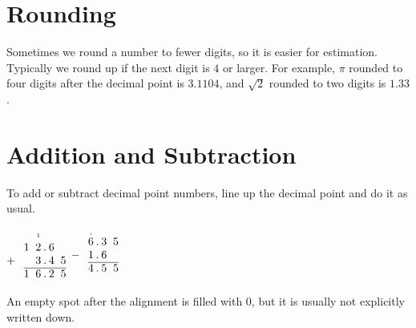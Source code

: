 \section{Rounding}

Sometimes we round a number to fewer digits, so it is easier for estimation. Typically we round up if the next digit is $4$ or larger. For example, $\pi$ rounded to four digits after the decimal point is $3.1104$, and $\sqrt{2}$ rounded to two digits is $1.33$.

\section{Addition and Subtraction}

To add or subtract decimal point numbers, line up the decimal point and do it as usual.
\begin{center}
$\begin{array}{@{}c@{\hspace{0.75em}}c@{\hspace{0.55em}}c@{\hspace{0.2em}}c@{\hspace{0.2em}}c@{\hspace{0.55em}}c@{}}
      &                      & {\scriptscriptstyle 1} &   &   &   \\
      & 1                    & 2                      & . & 6 &   \\
    + &                      & 3                      & . & 4 & 5 \\
    \cline{2-6}
      & 1                    & 6                      & . & 2 & 5
\end{array}$
\hspace{3.5em}
$\begin{array}{@{}c@{\hspace{0.75em}}c@{\hspace{0.2em}}c@{\hspace{0.2em}}c@{\hspace{0.55em}}c@{}}
    & \mbox{\shortstack{.\\6}} & . & 3 & 5 \\
  - & 1                        & . & 6 &   \\
  \cline{2-5}
    & 4                        & . & 5 & 5
\end{array}$
\end{center}
An empty spot after the alignment is filled with $0$, but it is usually not explicitly written down.


